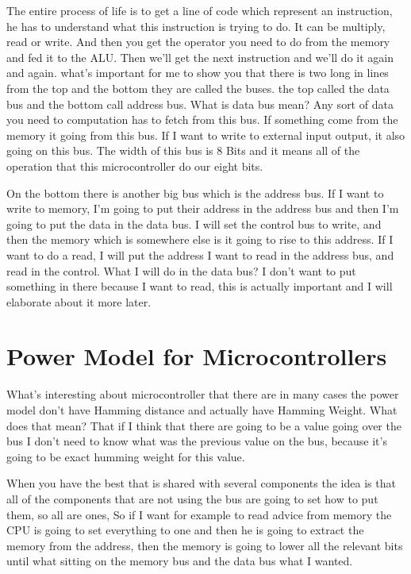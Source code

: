 The entire process of life is to get a line of code which represent an instruction, he has to understand what this instruction is trying to do. It can be multiply, read or write. And then you get the operator you need to do from the memory and fed it to the ALU. Then we'll get the next instruction and we'll do it again and again. what's important for me to show you that there is two long in lines from the top and the bottom they are called the buses. the top called the data bus and the bottom call address bus. What is data bus mean? Any sort of data you need to computation has to fetch from this bus. If something come from the memory it going from this bus. If I want to write to external input output, it also going on this bus. The width of this bus is 8 Bits and it means all of the operation that this microcontroller do our eight bits.

On the bottom there is another big bus which is the address bus. If I want to write to memory, I'm going to put their address in the address bus and then I'm going to put the data in the data bus. I will set the control bus to write, and then the memory which is somewhere else is it going to rise to this address. If I want to do a read, I will put the address I want to read in the address bus, and read in the control. What I will do in the data bus? I don't want to put something in there because I want to read, this is actually important and I will elaborate about it more later.

\section{Power Model for Microcontrollers}
What's interesting about microcontroller that there are in many cases the power model don't have Hamming distance and actually have Hamming Weight. What does that mean? That if I think that there are going to be a value going over the bus I don't need to know what was the previous value on the bus, because it's going to be exact humming weight for this value. 

When you have the best that is shared with several components the idea is that all of the components that are not using the bus are going to set how to put them, so all are ones, So if I want for example to read advice from memory the CPU is going to set everything to one and then he is going to extract the memory from the address, then the memory is going to lower all the relevant bits until what sitting on the memory bus and the data bus what I wanted. 

